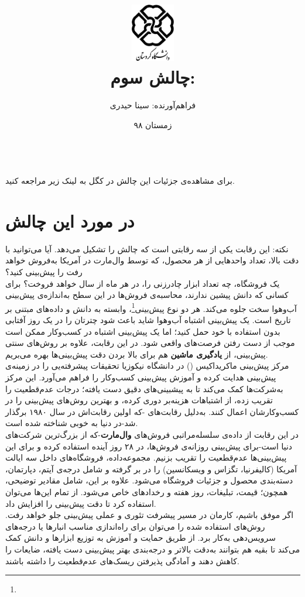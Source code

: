 \documentclass{article}
\title{\includegraphics[width=1in,height=1in]{logo.png}
	\\[1cm]
	چالش سوم: \lr{M5 Forecasting - Accuracy} }
\author{فراهم‌آورنده: سینا حیدری}
\date{زمستان ۹۸}
\begin{document}
	\maketitle
	\newpage
	\ \\
	برای مشاهده‌ی جزئیات این چالش در کگل به لینک زیر مراجعه کنید.\\
\begin{flushleft}
	\href{https://www.kaggle.com/c/m5-forecasting-accuracy}{}
\end{flushleft}
\section{در مورد این چالش}
نکته: این رقابت یکی از سه رقابتی است که چالش  را تشکیل می‌دهد. آیا می‌توانید با دقت بالا، تعداد واحدهایی از هر محصول، که توسط وال‌مارت در آمریکا به‌فروش خواهد رفت را پیش‌بینی کنید؟
\ \\
یک فروشگاه، چه تعداد ابزار چادرزنی را، در هر ماه از سال خواهد فروخت؟ برای کسانی که دانش پیشین ندارند، محاسبه‌ی فروش‌ها در این سطح به‌اندازه‌ی پیش‌بینی آب‌وهوا سخت جلوه می‌کند. هر دو نوع پیش‌بینی\footnote{}، وابسته به دانش و داده‌های مبتنی بر تاریخ است. یک پیش‌بینی اشتباه آب‌وهوا شاید باعث شود چترتان را در یک روز آفتابی بدون استفاده با خود حمل کنید؛ اما یک پیش‌بینی اشتباه در کسب‌وکار ممکن است موجب از دست رفتن فرصت‌های واقعی شود. در این رقابت، علاوه بر روش‌های سنتی پیش‌بینی، از \textbf{یادگیری ماشین} هم برای بالا بردن دقت پیش‌بینی‌ها بهره می‌بریم.
\ \\
مرکز پیش‌بینی ماکریداکیس () در دانشگاه نیکوزیا تحقیقات پیشرفته‌یی را در زمینه‌ی پیش‌بینی هدایت کرده و آموزش پیش‌بینی‌ کسب‌وکار را فراهم می‌آورد. این مرکز به‌شرکت‌ها کمک می‌کند تا به پیشبینی‌های دقیق دست یافته؛ درجات عدم‌قطعیت را تقریب زده، از اشتباهات هزینه‌بر دوری کرده، و بهترین روش‌های پیش‌بینی را در کسب‌وکارشان اعمال کنند.  به‌دلیل رقابت‌های -که اولین رقابت‌اش در سال ۱۹۸۰ برگذار شد-در دنیا به خوبی شناخته شده است.
\ \\
در این رقابت از داده‌ی سلسله‌مراتبی فروش‌های \textbf{وال‌مارت}-که از بزرگ‌ترین شرکت‌های دنیا است-برای پیش‌بینی روزانه‌ی فروش‌ها، در ۲۸ روز آینده استفاده کرده و برای این پیش‌بینی‌ها عدم‌قطعیت را تقریب بزنیم. مجموعه‌داده، فروشگاه‌های داخل سه ایالت آمریکا (کالیفرنیا، تگزاس و ویسکانسین) را در بر گرفته و شامل درجه‌ی آیتم، دپارتمان، دسته‌بندی محصول و جزئیات فروشگاه می‌شود. علاوه بر این، شامل مقادیر توضیحی، همچون؛ قیمت، تبلیغات، روز هفته و رخدادهای خاص می‌شود. از تمام این‌ها می‌توان استفاده کرد تا دقت پیش‌بینی را افزایش داد. 
\ \\
اگر موفق باشیم، کارمان در مسیر پیشرفت تئوری و عملی پیش‌بینی جلو خواهد رفت. روش‌های استفاده شده را می‌توان برای راه‌اندازی مناسب انبارها یا درجه‌های سرویس‌دهی به‌کار برد.  از طریق حمایت و آموزش به توزیع ابزار‌ها و دانش کمک می‌کند تا بقیه هم بتوانند به‌دقت بالاتر و درجه‌بندی بهتر پیش‌بینی دست یافته، ضایعات را کاهش دهند و آمادگی پذیرفتن ریسک‌های عدم‌قطعیت را داشته باشند.
\end{document}
